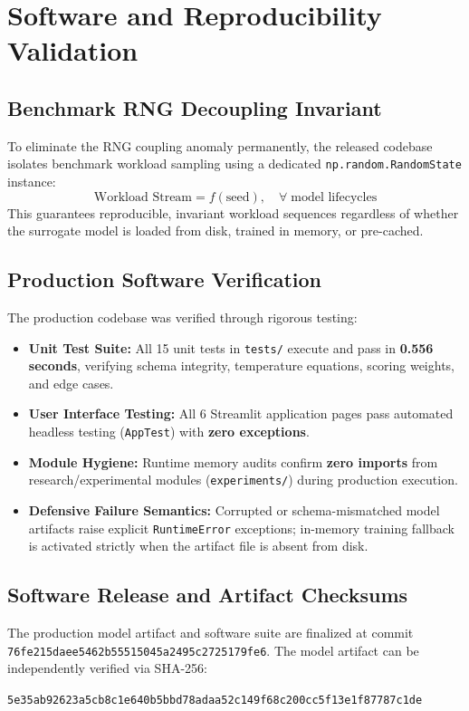 \documentclass[conference,10pt]{IEEEtran}
\begin{document}
\section{Software and Reproducibility Validation}
\label{sec:verification}

\subsection{Benchmark RNG Decoupling Invariant}
To eliminate the RNG coupling anomaly permanently, the released codebase isolates benchmark workload sampling using a dedicated \texttt{np.random.RandomState} instance:
\begin{equation}
\text{Workload Stream} = f(\text{seed}), \quad \forall \; \text{model lifecycles}
\end{equation}
This guarantees reproducible, invariant workload sequences regardless of whether the surrogate model is loaded from disk, trained in memory, or pre-cached.

\subsection{Production Software Verification}
The production codebase was verified through rigorous testing:
\begin{itemize}
    \item \textbf{Unit Test Suite:} All 15 unit tests in \texttt{tests/} execute and pass in \textbf{0.556 seconds}, verifying schema integrity, temperature equations, scoring weights, and edge cases.
    \item \textbf{User Interface Testing:} All 6 Streamlit application pages pass automated headless testing (\texttt{AppTest}) with \textbf{zero exceptions}.
    \item \textbf{Module Hygiene:} Runtime memory audits confirm \textbf{zero imports} from research/experimental modules (\texttt{experiments/}) during production execution.
    \item \textbf{Defensive Failure Semantics:} Corrupted or schema-mismatched model artifacts raise explicit \texttt{RuntimeError} exceptions; in-memory training fallback is activated strictly when the artifact file is absent from disk.
\end{itemize}

\subsection{Software Release and Artifact Checksums}
The production model artifact and software suite are finalized at commit \texttt{76fe215daee5462b55515045a2495c2725179fe6}. The model artifact can be independently verified via SHA-256:
\vspace{2pt}
\begin{center}
{\fontsize{6.5}{7.5}\selectfont\texttt{5e35ab92623a5cb8c1e640b5bbd78adaa52c149f68c200cc5f13e1f87787c1de}}
\end{center}
\end{document}
